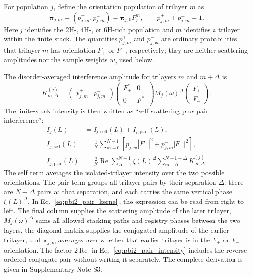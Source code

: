 For population $j$, define the orientation population of trilayer $m$ as
\begin{equation}
  \boldsymbol{\pi}_{j,m}
  =\left(p_{j,m}^{+},p_{j,m}^{-}\right)
  =\boldsymbol{\pi}_{j,0}P_j^m,
  \qquad p_{j,m}^{+}+p_{j,m}^{-}=1.
  \label{eq:pbi2_orientation_population}
\end{equation}
Here $j$ identifies the 2H-, 4H-, or 6H-rich population and $m$ identifies a
trilayer within the finite stack.  The quantities $p_{j,m}^{+}$ and
$p_{j,m}^{-}$ are ordinary probabilities that trilayer $m$ has orientation
$F_+$ or $F_-$, respectively; they are neither scattering amplitudes nor the
sample weights $w_j$ used below.

The disorder-averaged interference amplitude for trilayers $m$ and
$m+\Delta$ is
\begin{equation}
  K_{m,\Delta}^{(j)}=
  \begin{pmatrix}p_{j,m}^{+} & p_{j,m}^{-}\end{pmatrix}
  \begin{pmatrix}F_+^* & 0\\0 & F_-^*\end{pmatrix}
  M_j(\omega)^\Delta
  \begin{pmatrix}F_+\\F_-\end{pmatrix}.
  \label{eq:pbi2_pair_kernel}
\end{equation}
The finite-stack intensity is then written as ``self scattering plus pair
interference'':
\begin{subequations}
\label{eq:pbi2_finite_intensity}
\begin{align}
  I_j(L)
  &=I_{j,\mathrm{self}}(L)+I_{j,\mathrm{pair}}(L),
  \label{eq:pbi2_intensity_split}\\
  I_{j,\mathrm{self}}(L)
  &=\frac{1}{N}\sum_{m=0}^{N-1}
  \left[p_{j,m}^{+}|F_+|^2+p_{j,m}^{-}|F_-|^2\right],
  \label{eq:pbi2_self_intensity}\\
  I_{j,\mathrm{pair}}(L)
  &=\frac{2}{N}\operatorname{Re}
  \sum_{\Delta=1}^{N-1}\xi(L)^\Delta
  \sum_{m=0}^{N-1-\Delta}K_{m,\Delta}^{(j)}.
  \label{eq:pbi2_pair_intensity}
\end{align}
\end{subequations}
The self term averages the isolated-trilayer intensity over the two possible
orientations.  The pair term groups all trilayer pairs by their separation
$\Delta$: there are $N-\Delta$ pairs at that separation, and each carries the
same vertical phase $\xi(L)^\Delta$.  In
Eq.~\eqref{eq:pbi2_pair_kernel}, the expression can be read from right to
left.  The final column supplies the scattering amplitude of the later
trilayer, $M_j(\omega)^\Delta$ sums all allowed stacking paths and registry
phases between the two layers, the diagonal matrix supplies the conjugated
amplitude of the earlier trilayer, and $\boldsymbol{\pi}_{j,m}$ averages over
whether that earlier trilayer is in the $F_+$ or $F_-$ orientation.  The
factor $2\operatorname{Re}$ in Eq.~\eqref{eq:pbi2_pair_intensity} includes the
reverse-ordered conjugate pair without writing it separately.  The complete
derivation is given in Supplementary Note S3.

